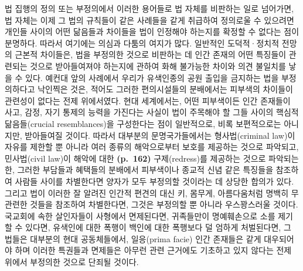 법 집행의 정의 또는 부정의에서 이러한 용어들로 법 자체를 비판하는 일로
넘어가면, 법 자체는 이제 그 법의 규칙들이 같은 사례들을 같게 취급하여
정의로울 수 있으려면 개인들 사이의 어떤 닮음들과 차이들을 법이 인정해야
하는지를 확정할 수 없다는 점이 분명하다. 따라서 여기에는 의심과 다툼의
여지가 많다. 일반적인 도덕적·정치적 전망의 근본적 차이들은, 법을
부정의한 것으로 비판하는 데 인간 존재의 어떤 특징들이 관련되는 것으로
받아들여져야 하는지에 관하여 화해 불가능한 차이와 의견 불일치를 낳을 수
있다. 예컨대 앞의 사례에서 우리가 유색인종의 공원 출입을 금지하는 법을
부정의하다고 낙인찍은 것은, 적어도 그러한 편의시설들의 분배에서는
피부색의 차이들이 관련성이 없다는 전제 위에서였다. 현대 세계에서는, 어떤
피부색이든 인간 존재들이 사고, 감정, 자기 통제의 능력을 가진다는 사실이
법이 주목해야 할 그들 사이의 핵심적 닮음들(crucial resemblances)을
구성한다는 점이 일반적으로, 비록 보편적으로는 아니지만, 받아들여질
것이다. 따라서 대부분의 문명국가들에서는 형사법(criminal law)이 자유를
제한할 뿐 아니라 여러 종류의 해악으로부터 보호를 제공하는 것으로
파악되고, 민사법(civil law)이 해악에 대한 \textbf{(p.~162)}
구제(redress)를 제공하는 것으로 파악되는 한, 그러한 부담들과 혜택들의
분배에서 피부색이나 종교적 신념 같은 특징들을 참조하여 사람들 사이를
차별한다면 양자가 모두 부정의할 것이라는 데 상당한 합의가 있다. 그리고
법이 이러한 잘 알려진 인간적 편견의  대신 키, 몸무게,
아름다움처럼 명백히 무관련한 것들을 참조하여 차별한다면, 그것은 부정의할
뿐 아니라 우스꽝스러울 것이다. 국교회에 속한 살인자들이 사형에서
면제된다면, 귀족들만이 명예훼손으로 소를 제기할 수 있다면, 유색인에 대한
폭행이 백인에 대한 폭행보다 덜 엄하게 처벌된다면, 그 법들은 대부분의
현대 공동체들에서, 일응(prima facie) 인간 존재들은 같게 대우되어야 하며
이러한 특권들과 면제들은 아무런 관련 근거에도 기초하고 있지 않다는 전제
위에서 부정의한 것으로 단죄될 것이다.

